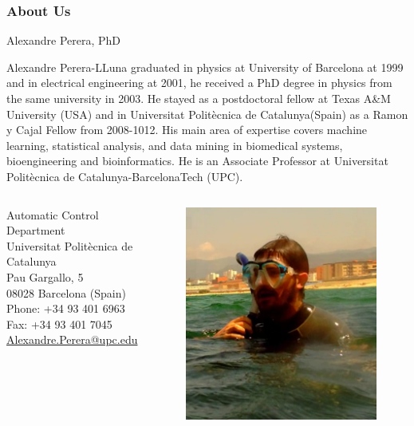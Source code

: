 \documentclass[9pt,colorlinks]{beamer}
\begin{document}
\begin{frame}[plain]\frametitle{About Us}

\begin{block}{Alexandre Perera, PhD}

    \small Alexandre Perera-LLuna graduated in physics at University of Barcelona at 1999 and in electrical engineering at 2001, he received a PhD degree in physics from the same university in 2003. He stayed as a postdoctoral fellow at Texas A\&M University (USA) and in Universitat Politècnica de Catalunya(Spain) as a Ramon y Cajal Fellow from 2008-1012. His main area of expertise covers machine learning, statistical analysis, and data mining in biomedical systems, bioengineering and bioinformatics. He is an Associate Professor at Universitat Politècnica de Catalunya-BarcelonaTech (UPC).
\end{block}
\begin{columns}[c]
Automatic Control Department\\
Universitat Politècnica de Catalunya\\
Pau Gargallo, 5\\
08028 Barcelona (Spain)\\
Phone: +34 93 401 6963\\
Fax: +34 93 401 7045\\
\href{Alexandre.Perera@upc.edu}{Alexandre.Perera@upc.edu}

 
\begin{figure}[!htb]
    \centering
    \includegraphics[width=\textwidth]{figs/alex1}
\end{figure}
\end{columns}
\end{frame}
\end{document}
